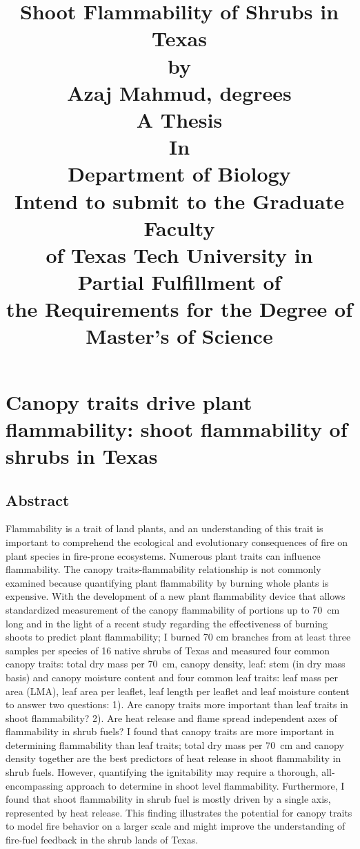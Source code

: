 \documentclass[12pt]{report}
\title{
Shoot Flammability of Shrubs in Texas\\[15pt]
by\\
Azaj Mahmud, degrees\\
A Thesis\\
In\\
Department of Biology\\
Intend to submit to the Graduate Faculty\\
of Texas Tech University in\\
Partial Fulfillment of\\
the Requirements for the Degree of\\
Master's of Science\\}
\begin{document}
\maketitle







\tableofcontents




\listoftables

\listoffigures




\doublespacing

\chapter{Canopy traits drive plant flammability: shoot flammability of shrubs in Texas}

\section{Abstract}
    
Flammability is a trait of land plants, and an understanding of this trait is important to comprehend the ecological and evolutionary consequences of fire on plant species in fire-prone ecosystems. Numerous plant traits can influence flammability. The canopy traits-flammability relationship is not commonly examined because quantifying plant flammability by burning whole plants is expensive. With the development of a new plant flammability device that allows standardized measurement of the canopy
flammability of portions up to 70 \,cm long and in the light of a recent study regarding the effectiveness of burning shoots to predict plant flammability; I burned 70 cm branches from at least three samples per species of 16 native shrubs of Texas and measured four common canopy traits: total dry mass per 70 \,cm, canopy density, leaf: stem (in dry mass basis) and canopy moisture content and four common leaf traits: leaf mass per area (LMA), leaf area per leaflet, leaf length per leaflet and leaf moisture content to answer two questions: 1).  Are canopy traits more important than leaf traits in shoot flammability? 2). Are heat release and flame spread independent axes of flammability in shrub fuels?  I found that canopy traits are more important in determining flammability than leaf traits; total dry mass per 70 \,cm and canopy density together are the best predictors of heat release in shoot flammability in shrub fuels. However, quantifying the ignitability may require a thorough, all-encompassing approach to determine in shoot level flammability. Furthermore, I found that shoot flammability in shrub fuel is mostly driven by a single axis, represented by heat release. This finding illustrates the potential for canopy traits to model fire behavior on a larger scale and might improve the understanding of fire-fuel feedback in the shrub lands of Texas.
\end{document}
